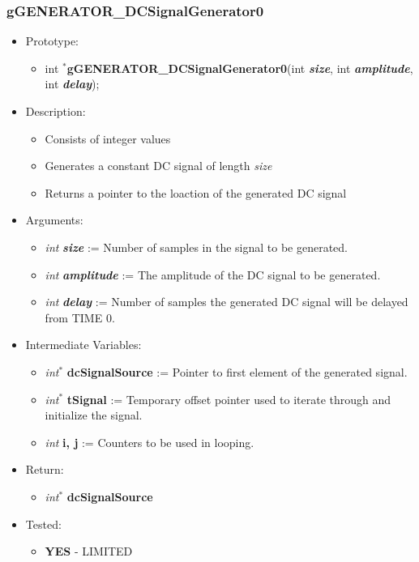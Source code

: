 \documentclass{article}
\begin{document}
{\subsubsection{gGENERATOR\_DCSignalGenerator0}
{\renewcommand{\labelitemi}{$\bullet$}
\begin{itemize}
\item Prototype:
	\begin{itemize}
	\item int $^{\ast}$\textbf{gGENERATOR\_DCSignalGenerator0}(int \textit{\textbf{size}}, int \textit{\textbf{amplitude}}, int \textit{\textbf{delay}});
	\end{itemize}
\item Description:
	\begin{itemize}[noitemsep]
	\item Consists of integer values
	\item Generates a constant DC signal of length \textit{size}
	\item Returns a pointer to the loaction of the generated DC signal
	\end{itemize}
\item Arguments:
	\begin{itemize}[noitemsep]
	\item \textit{int} \textit{\textbf{size}} := Number of samples in the signal to be generated.
	\item \textit{int} \textit{\textbf{amplitude}} := The amplitude of the DC signal to be generated.
	\item \textit{int} \textit{\textbf{delay}} := Number of samples the generated DC signal will be delayed from TIME 0.
	\end{itemize} 
\item Intermediate Variables:
	\begin{itemize}[noitemsep]
	\item \textit{int$^{\ast}$} \textbf{dcSignalSource} := Pointer to first element of the generated signal.
	\item \textit{int$^{\ast}$} \textbf{tSignal} := Temporary offset pointer used to iterate through and initialize the signal.
	\item \textit{int} \textbf{i, j} := Counters to be used in looping.
	\end{itemize}
\item Return:
	\begin{itemize}
	\item \textit{int$^{\ast}$} \textbf{dcSignalSource}
	\end{itemize}
\item Tested:
	\begin{itemize}
	\item \textbf{YES} - LIMITED
	\end{itemize}
\end{itemize}

}}
\end{document}
